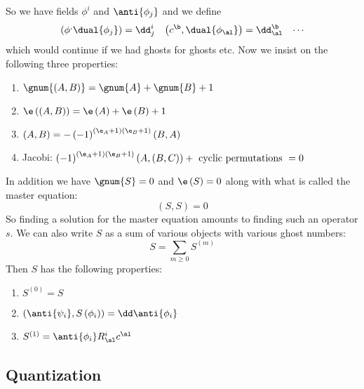 \documentclass{booc}
\begin{document}
So we have fields 
$\phi^i$ and $\anti{\phi_j}$
and we define 
\begin{align}
\left( \phi^ , \dual{\phi_j} \right) = \dd_j^i
&&
\left( c^\b , \dual{\phi_\al} \right) = \dd^\b_\al
&&
\cdots
\end{align}
which would continue if we had ghosts for ghosts etc.
Now we insist on the following three properties:
\begin{enumerate}
\item $\gnum{\left( A , B \right)} = \gnum{A} + \gnum{B} + 1$
\item $\e\left( \left( A , B \right) \right) = \e\left( A \right) + \e\left( B \right) + 1$
\item $\left( A , B \right) = -\left( -1 \right)^{\left( \e_A + 1 \right)\left( \e_B + 1 \right)}
\left( B , A \right)$
\item Jacobi:
$\left( -1 \right)^{\left( \e_A + 1 \right)\left( \e_B + 1 \right)}
\left( A , \left( B , C \right) \right) + \text{ cyclic permutations } = 0$
\end{enumerate}

In addition we have  $\gnum{S} = 0$ and $\e\left( S \right) = 0$ along with
what is called the master equation:
\begin{equation}
\left( S , S \right) = 0
\end{equation}
So finding a solution for the master equation amounts to finding such an operator $s$. 
We can also write $S$ as a sum of various objects with various ghost numbers:
\begin{equation}
S = \sum_{m\geq 0} S^{\left( m \right)}
\end{equation}
Then $S$ has the following properties:
\begin{enumerate}
\item $S^{\left( 0 \right)} = S$
\item $\left( \anti{\psi_i} , S\left( \phi_i \right) \right) = \dd \anti{\phi_i}$
\item $S^{\left( 1 \right)} = \anti{\phi_i}R^i_\al c^\al$
\end{enumerate}

\subsection{Quantization}
\end{document}
